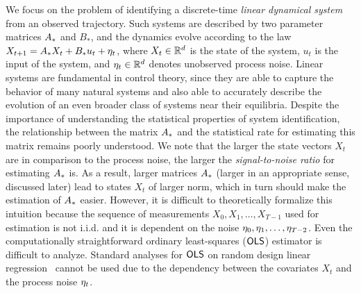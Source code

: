 We focus on the problem of identifying a discrete-time \emph{linear dynamical system}
from an observed trajectory. Such systems are described by two parameter matrices 
$A_{*}$ and $B_*$, and the dynamics evolve according to the law $X_{t+1} = A_{*} X_t + B_* u_t + \eta_t$, where $X_t\in \mathbb{R}^d$ is the state of the system, $u_t$ is the input of the system, and $\eta_t \in \mathbb{R}^d$ denotes unobserved process noise. Linear systems are fundamental in control theory, since they are able to capture the behavior of many natural systems and also able to accurately describe the evolution of an even broader class of systems near their equilibria.
%
Despite the importance of understanding the statistical properties of system identification, the relationship between the matrix $A_{*}$ and the statistical rate for estimating this matrix remains poorly understood. 
We note that the larger the state vectors $X_t$ are in comparison to the process noise, the larger the \emph{signal-to-noise ratio} 
for estimating $A_{*}$ is. As a result, larger matrices $A_{*}$ (larger in an appropriate sense, discussed later) lead to states $X_t$ of larger norm, which in turn should make the estimation of $A_{*}$ easier. However, it is difficult to theoretically formalize this intuition because the sequence of measurements $X_0, X_1, \ldots, X_{T - 1}$ used for estimation is not i.i.d. and it is dependent on the noise $\eta_0, \eta_1, \ldots, \eta_{T - 2}$. Even the computationally 
straightforward ordinary least-squares ($\mathsf{OLS }$) estimator is difficult to analyze. Standard analyses for $\mathsf{OLS }$ on random design linear regression~\citep{hsu14} cannot be used due to the dependency between the covariates $X_t$ and the process noise $\eta_t$.


